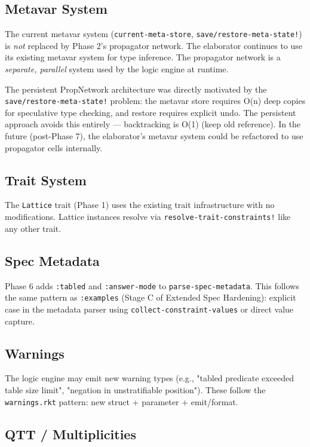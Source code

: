 \documentclass[11pt]{article}
\begin{document}
\subsection{Metavar System}
\label{sec:orgce6084a}

The current metavar system (\texttt{current-meta-store}, \texttt{save/restore-meta-state!})
is \emph{not} replaced by Phase 2's propagator network. The elaborator continues
to use its existing metavar system for type inference. The propagator network
is a \emph{separate, parallel} system used by the logic engine at runtime.

The persistent PropNetwork architecture was directly motivated by the
\texttt{save/restore-meta-state!} problem: the metavar store requires O(n) deep
copies for speculative type checking, and restore requires explicit undo.
The persistent approach avoids this entirely — backtracking is O(1) (keep
old reference). In the future (post-Phase 7), the elaborator's metavar
system could be refactored to use propagator cells internally.
\subsection{Trait System}
\label{sec:org093f2d6}

The \texttt{Lattice} trait (Phase 1) uses the existing trait infrastructure with
no modifications. Lattice instances resolve via \texttt{resolve-trait-constraints!}
like any other trait.
\subsection{Spec Metadata}
\label{sec:org2e7df89}

Phase 6 adds \texttt{:tabled} and \texttt{:answer-mode} to \texttt{parse-spec-metadata}. This
follows the same pattern as \texttt{:examples} (Stage C of Extended Spec Hardening):
explicit case in the metadata parser using \texttt{collect-constraint-values} or
direct value capture.
\subsection{Warnings}
\label{sec:org91c7102}

The logic engine may emit new warning types (e.g., "tabled predicate exceeded
table size limit", "negation in unstratifiable position"). These follow the
\texttt{warnings.rkt} pattern: new struct + parameter + emit/format.
\subsection{QTT / Multiplicities}
\label{sec:org02caa5b}
\end{document}
